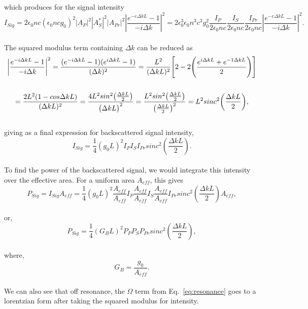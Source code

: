 which produces for the signal intensity
\\
\begin{equation}
  I_{Sig} = 2\epsilon_{0}nc(\epsilon_{0}ncg_{0})^{2}|A_{P}|^{2}|A_{S}^{*}|^{2}|A_{Pr}|^{2}\left|\frac{e^{-e\Delta kL} - 1}{-i\Delta k}\right|^{2}
  = 2\epsilon_{0}^{3}\epsilon_{0}n^{3}c^{3}g_{0}^{2}\frac{I_{P}}{2\epsilon_{0}nc}\frac{I_{S}}{2\epsilon_{0}nc}\frac{I_{Pr}}{2\epsilon_{0}nc}\left|\frac{e^{-e\Delta kL} - 1}{-i\Delta k}\right|^{2}.
\end{equation}
\\
The squared modulus term containing \(\Delta k\) can be reduced as
\\
\begin{gather}
  \bigg|\frac{e^{-i\Delta kL} - 1}{-i\Delta k}\bigg|^{2} = \frac{(e^{-i\Delta kL} - 1)(e^{i\Delta kL} - 1)}{(\Delta k)^{2}} = \frac{L^{2}}{(\Delta kL)^{2}}\Bigg[ 2 - 2\Bigg(\frac{e^{i\Delta kL} + e^{-1\Delta kL}}{2}\Bigg)\Bigg] \notag \\ \notag \\
  = \frac{2L^{2}(1 - cos\Delta kL)}{(\Delta kL)^{2}} = \frac{4L^{2}sin^{2}\big(\frac{\Delta kL}{2}\big)}{\big(\Delta kL\big)^{2}} = \frac{L^{2}sin^{2}\big(\frac{\Delta kL}{2}\big)}{\big(\frac{\Delta kL}{2}\big)^{2}} = L^{2}sinc^{2}\bigg(\frac{\Delta kL}{2}\bigg),
\end{gather}
\\
giving as a final expression for backscattered signal intensity,
\\
\begin{equation}
I_{Sig} = \frac{1}{4}(g_{0}L)^{2}I_{P}I_{S}I_{Pr}sinc^{2}\left(\frac{\Delta kL}{2}\right).
\end{equation}
\\

To find the power of the backscattered signal, we would integrate this intensity over the effective area. For a uniform area \(A_{eff}\), this gives
\\
\begin{equation}
  P_{Sig} = I_{Sig}A_{eff} = \frac{1}{4}(g_{0}L)^{2}\frac{A_{eff}}{A_{eff}}I_{P}\frac{A_{eff}}{A_{eff}}I_{S}\frac{A_{eff}}{A_{eff}}I_{Pr}sinc^{2}\left(\frac{\Delta kL}{2}\right)A_{eff},
\end{equation}
\\
or,
\\
\begin{equation}
  P_{Sig} = \frac{1}{4}(G_{B}L)^{2}P_{P}P_{S}P_{Pr}sinc^{2}\left(\frac{\Delta kL}{2}\right),
\end{equation}
\\
where,
\\
\begin{equation}
  G_{B} = \frac{g_{0}}{A_{eff}}.
\end{equation}
\\
We can also see that off resonance, the \(\Omega\) term from Eq.~\ref{eq:resonance} goes to a lorentzian form after taking the squared modulus for intensity.

